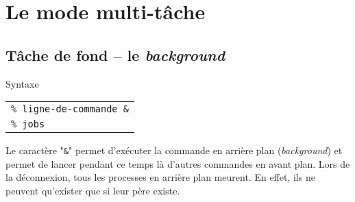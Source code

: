 %
%

\setcounter{remarque-cnt}{1}
\setcounter{example-cnt}{1}
\chapter{\label{multitask}Le mode multi-t{\^a}che}
\thispagestyle{fancy}

\section{T{\^a}che de fond -- le {\sl background}}

\begin{definition}{Syntaxe}
\begin{tabular}{@{\hspace{1cm}}l}
	{\tt \% ligne-de-commande \&}\\[0.2cm]
	{\tt \% jobs}\\[0.2cm]
\end{tabular}
\end{definition}

Le caract{\`e}re "\verb=&=" permet
d'ex{\'e}cuter la commande en arri{\`e}re plan (\textsl{background}) et
permet de lancer pendant ce temps l{\`a} d'autres commandes en avant
plan. Lors de la d{\'e}connexion, tous les processes en arri{\`e}re plan
meurent. En effet, ils ne peuvent qu'exister que si leur p{\`e}re
existe.

